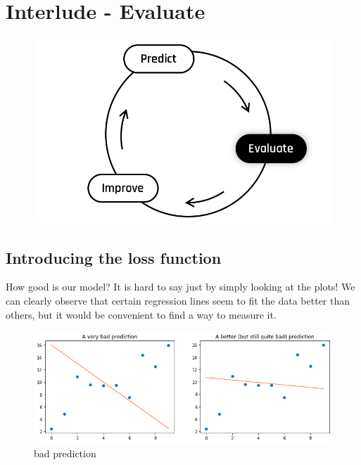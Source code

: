 
\section*{Interlude - Evaluate}

\begin{figure}[h!]
  \centering
  \includegraphics[scale=0.25]{assets/Evaluate.png}
\end{figure}

\subsection*{Introducing the loss function}

How good is our model?  
It is hard to say just by simply looking at the plots!
We can clearly observe that certain regression lines seem to fit the data better than others, but it would be convenient to find a way to measure it. 

\begin{figure}[h!]
  \centering
  \includegraphics[scale=0.55]{assets/bad_prediction.png}
  \caption{bad prediction}
\end{figure}

